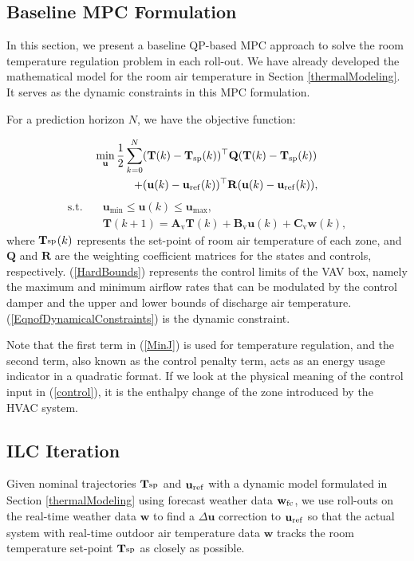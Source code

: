 \documentclass[conference]{IEEEtran}
\begin{document}
\subsection{Baseline MPC Formulation}
In this section, we present a baseline QP-based MPC approach to solve the room temperature regulation problem in each roll-out. We have already developed the mathematical model for the room air temperature in Section \ref{thermalModeling}. It serves as the dynamic constraints in this MPC formulation.

For a prediction horizon $N$, we have the objective function:

\begin{align}
\nonumber
\min\limits_{\mathbf{u}}\frac{1}{2}\sum_{k=0}^{N}&(\mathbf{T}(k)-\mathbf{T}_{\text{sp}}(k))^\top\mathbf{Q}(\mathbf{T}(k)-\mathbf{T}_{\text{sp}}(k))\\
+ & (\mathbf{u}(k)-\mathbf{u}_{\textsuperscript{ref}}(k))^\top\mathbf{R}(\mathbf{u}(k)-\mathbf{u}_{\textsuperscript{ref}}(k)), \label{MinJ}%
\end{align}
\begin{subequations}
\begin{align}
\textrm{s.t.} \quad & \mathbf{u}_{\min}  \leq\mathbf{u}(k)\leq\mathbf{u}_{\max},\label{HardBounds}\\
&\mathbf{T}(k+1) = \mathbf{A}_{\textrm{v}}\mathbf{T}(k) + \mathbf{B}_{\textrm{v}}\mathbf{u}(k) + \mathbf{C}_{\textrm{v}}\mathbf{w}(k),\label{EqnofDynamicalConstraints}
\end{align}
\end{subequations}
where $\mathbf{T}_{\textsuperscript{sp}}(k)$ represents the set-point of room air temperature of each zone, and $\mathbf{Q}$ and $\mathbf{R}$ are the weighting coefficient matrices for the states and controls, respectively. (\ref{HardBounds}) represents the control limits of the VAV box, namely the maximum and minimum airflow rates that can be modulated by the control damper and the upper and lower bounds of discharge air temperature. (\ref{EqnofDynamicalConstraints}) is the dynamic constraint.

Note that the first term in (\ref{MinJ}) is used for temperature regulation, and the second term, also known as the control penalty term, acts as an energy usage indicator in a quadratic format. If we look at the physical meaning of the control input in (\ref{control}), it is the enthalpy change of the zone introduced by the HVAC system.

\subsection{ILC Iteration}
Given nominal trajectories $\mathbf{T}_{\textsuperscript{sp}}$ and $\mathbf{u}_{\textsuperscript{ref}}$ with a dynamic model formulated in Section \ref{thermalModeling} using forecast weather data $\mathbf{w}_\textsuperscript{fc}$, we use roll-outs on the real-time weather data $\mathbf{w}$ to find a $\Delta\mathbf{u}$ correction to $\mathbf{u}_{\textsuperscript{ref}}$ so that the actual system with real-time outdoor air temperature data $\mathbf{w}$ tracks the room temperature set-point $\mathbf{T}_{\textsuperscript{sp}}$ as closely as possible.
\end{document}
